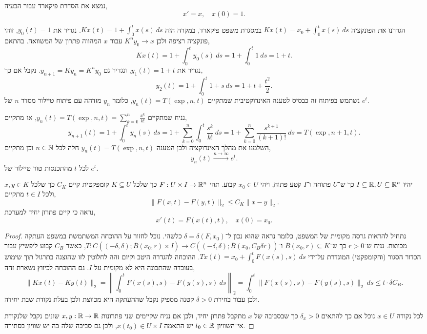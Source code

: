 \question{}
נמצא את הסדרת פיקארד עבור הבעיה,
\[
	x' = x,
	\quad
	x(0) = 1
.\]
\begin{solution}
	הגדרנו את הפונקציה $K x(t) = x_0 + \int_{0}^{t} x(s)\ ds$ במסגרת משפט פיקארד, במקרה הזה $K x(t) = 1 + \int_{0}^{t} x(s)\ ds$.
	נגדיר את $y_0(t) = 1$, זוהי פונקציה רציפה ולכן $K^n y_0 \to x$ עבור $x$ המהווה פתרון של המשוואה.
	בהתאם,
	\[
		K x(t)
		= 1 + \int_{0}^{t} y_0(s)\ ds
		= 1 + \int_{0}^{t} 1\ ds
		= 1 + t
	.\]
	נגדיר את $y_1(t) = 1 + t$, ונגדיר גם $y_{n + 1} = K y_n = K^n y_0$.
	נקבל אם כך,
	\[
		y_2(t)
		= 1 + \int_{0}^{t} 1 + s\ ds
		= 1 + t + \frac{t^2}{2}
	.\]
	נשתמש בפיתוח זה כבסיס לטענה האינדוקטיבית שמתקיים $y_n(t) = T(\exp, n, t)$, כלומר $y_n$ מזדהה עם פיתוח טיילור מסדר $n$ של $e^t$.

	נניח שמתקיים $y_n(t) = T(\exp, n, t) = \sum_{k = 0}^n \frac{x^k}{k!}$, אז מתקיים,
	\[
		y_{n + 1}(t)
		= 1 + \int_{0}^{t} y_n(s)\ ds
		= 1 + \sum_{k = 0}^n \int_{0}^{t} \frac{s^k}{k!}\ ds
		= 1 + \sum_{k = 0}^n \frac{s^{k + 1}}{(k + 1)!}\ ds
		= T(\exp, n + 1, t)
	.\]
	השלמנו את מהלך האינדוקציה ולכן הטענה $y_n(t) = T(\exp, n, t)$ חלה לכל $n \in \mathbb{N}$ וכן מתקיים,
	\[
		y_n(t) \xrightarrow{n \to \infty} e^t
	.\]
	לכל $t$ מהתכנסות טור טיילור של $e^t$.
\end{solution}

\question{}
יהיו $I \subseteq \mathbb{R}, U \subseteq \mathbb{R}^n$ כך ש־$U$ פתוחה ו־$I$ קטע פתוח, ויהי $x_0 \in U$ קבוע.
תהי $F : U \times I \to \mathbb{R}^n$ כך שלכל $K \subseteq U$ קומפקטית קיים $C_K$ כך שלכל $x, y \in K$ ולכל $t \in I$ מתקיים,
\[
	\lVert F(x, t) - F(y, t) \rVert_2
	\le C_K \lVert x - y \rVert_2
.\]
נראה כי קיים פתרון יחיד למערכת,
\[
	x'(t) = F(x(t), t),
	\quad
	x(0) = x_0
.\]
\begin{proof}
	נתחיל להראות גרסה מקומית של המשפט, כלומר נראה שהוא נכון ל־$\delta = \delta(F, x_0)$ כלשהי.
	נוכל לחזור על ההוכחה המשתמשת במשפט העתקה מכווצת.
	נניח ש־$r > 0$ כך ש־$\overline{B}(x_0, r) \subseteq K$ ו־$T : C((-\delta, \delta); \overline{B}(x_0, r) \times I) \to C((-\delta, \delta); \overline{B}(x_0, C_B \delta r))$,
	כאשר $C_B$ קבוע ליפשיץ עבור הכדור הסגור (והקומפקטי) המוגדרת על־ידי $T x(t) = x_0 + \int_0^t F(x(s), s)\ ds$.
	ההוכחה להגדרה היטב וקיום זהה לחלוטין לזו שהוצגה בתרגול תוך שימוש בעובדה שהתכונה היא לא מקומית על $I$.
	גם ההוכחה לכיווץ נשארת זהה,
	\[
		\lVert K x(t) - K y(t) \rVert_2
		= \left\lVert \int_0^t F(x(s), s) - F(y(s), s)\ ds \right\rVert_2
		= \int_0^t \lVert F(x(s), s) - F(y(s), s) \rVert_2\ ds
		\le t \cdot \delta C_B
	.\]
	ולכן עבור בחירת $\delta > 0$ קטנה מספיק נקבל שההעתקה היא מכווצת ולכן בעלת נקודת שבת יחידה.

	לכל נקודה $x \in U$ נוכל אם כך להתאים $\delta_x > 0$ כך שבסביבה של $x$ מתקבל פתרון יחיד, ולכן אם נניח שקיימים שני פתרונות $x, y : \mathbb{R} \to \mathbb{R}$ שונים נקבל שלנקודת אי־השוויון $t_0 \in \mathbb{R}$ יש התאמה $x(t_0) \in U \times I$,
	ולכן גם סביבה שלה בה יש שוויון בסתירה.
\end{proof}


